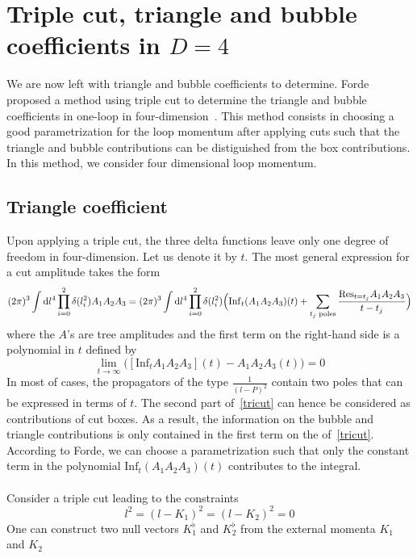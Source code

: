 \section{Triple cut, triangle and bubble coefficients in $D=4$}\label{sect-triple_cut}
We are now left with triangle and bubble coefficients to determine. 
Forde proposed a method using triple cut to determine the triangle and bubble coefficients in one-loop in four-dimension~\cite{Forde:2007mi}.
This method consists in choosing a good parametrization for the loop momentum after applying cuts such that the triangle and bubble contributions can be distiguished from the box contributions.
In this method, we consider four dimensional loop momentum.
%
\subsection*{Triangle coefficient} 
Upon applying a triple cut, the three delta functions leave only one degree of freedom in four-dimension. 
Let us denote it by $t$.
The most general expression for a cut amplitude takes the form 
\begin{equation}\label{tricut}
(2\pi)^3\int\textrm{d} l^4 \prod_{i=0}^2 \delta(l_i^2) A_1A_2A_3 = 
(2\pi)^3\int\textrm{d} l^4 \prod_{i=0}^2 \delta(l_i^2)\Big(\mathrm{Inf}_t(A_1A_2A_3)(t) + \sum_{\textrm{$t_j$ poles}}\frac{\mathrm{Res}_{t = t_j}A_1 A_2 A_3}{t-t_j}\Big)
\end{equation}
where the $A$'s are tree amplitudes and the first term on the right-hand side is a polynomial in $t$ defined by
\begin{equation*}
\lim_{t\rightarrow\infty}\big([\mathrm{Inf}_tA_1A_2A_3](t) - A_1A_2A_3(t)\big) = 0
\end{equation*}
In most of cases, the propagators of the type $\frac{1}{(l-P)^2}$ contain two poles that can be expressed in terms of $t$. 
The second part of~\cref{tricut} can hence be considered as contributions of cut boxes. 
As a result, the information on the bubble and triangle contributions is only contained in the first term on the \rhs of~\cref{tricut}.
According to Forde, we can choose a parametrization such that only the constant term in the polynomial $\mathrm{Inf}_t(A_1A_2A_3)(t)$ contributes to the integral. 
%
\\\\
Consider a triple cut leading to the constraints
\begin{equation*}
l^2 = (l-K_1)^2 = (l-K_2)^2 = 0
\end{equation*}
One can construct two null vectors $K_1^\flat$ and $K_2^\flat$ from the external momenta $K_1$ and $K_2$ 
